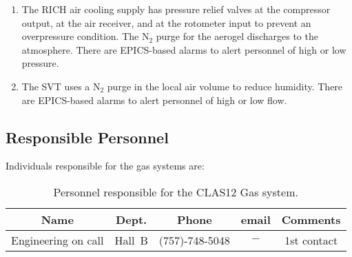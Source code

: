 \begin{enumerate}
\item The RICH air cooling supply has pressure relief valves at the compressor output, at the 
air receiver, and at the rotometer input to prevent an overpressure condition. The N$_2$ purge 
for the aerogel discharges to the atmosphere. There are EPICS-based alarms to alert personnel 
of high or low pressure.

\item The SVT uses a N$_2$ purge in the local air volume to reduce humidity. There are 
EPICS-based alarms to alert personnel of high or low flow.
\end{enumerate}

\subsection{Responsible Personnel}

Individuals responsible for the gas systems are:

\begin{table}[!htb]
\centering
\begin{tabular}{|c|c|c|c|c|} \hline
Name&Dept.&Phone&email&Comments \\ \hline
Engineering on call&Hall~B&(757)-748-5048&$-$& 1st contact \\ \hline
\end{tabular}
\caption{Personnel responsible for the CLAS12 Gas system.} 
\label{tb:gas}
\end{table}

